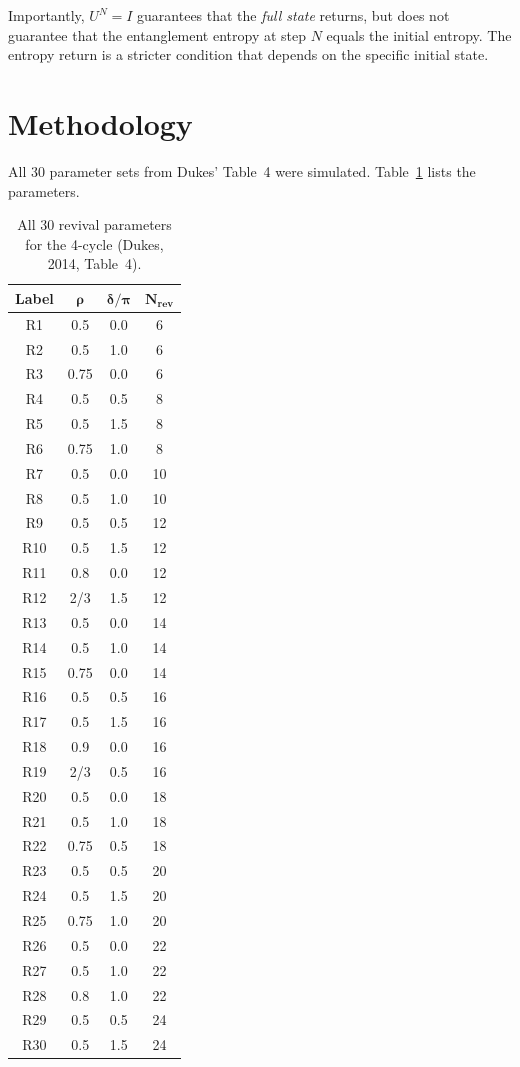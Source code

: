 \documentclass[12pt,a4paper]{article}
\begin{document}
Importantly, $U^N = I$ guarantees that the \emph{full state} returns, but does not guarantee that the entanglement entropy at step $N$ equals the initial entropy. The entropy return is a stricter condition that depends on the specific initial state.

\section{Methodology}

All 30 parameter sets from Dukes' Table~4 \cite{dukes} were simulated. Table~\ref{tab:parameters} lists the parameters.

\begin{table}[H]
\centering
\caption{All 30 revival parameters for the 4-cycle (Dukes, 2014, Table~4).}
\label{tab:parameters}
\begin{tabular}{cccc}
\toprule
\textbf{Label} & $\boldsymbol{\rho}$ & $\boldsymbol{\delta/\pi}$ & $\boldsymbol{N_{\text{rev}}}$ \\
\midrule
R1  & 0.5   & 0.0 & 6  \\
R2  & 0.5   & 1.0 & 6  \\
R3  & 0.75  & 0.0 & 6  \\
R4  & 0.5   & 0.5 & 8  \\
R5  & 0.5   & 1.5 & 8  \\
R6  & 0.75  & 1.0 & 8  \\
R7  & 0.5   & 0.0 & 10 \\
R8  & 0.5   & 1.0 & 10 \\
R9  & 0.5   & 0.5 & 12 \\
R10 & 0.5   & 1.5 & 12 \\
R11 & 0.8   & 0.0 & 12 \\
R12 & 2/3   & 1.5 & 12 \\
R13 & 0.5   & 0.0 & 14 \\
R14 & 0.5   & 1.0 & 14 \\
R15 & 0.75  & 0.0 & 14 \\
R16 & 0.5   & 0.5 & 16 \\
R17 & 0.5   & 1.5 & 16 \\
R18 & 0.9   & 0.0 & 16 \\
R19 & 2/3   & 0.5 & 16 \\
R20 & 0.5   & 0.0 & 18 \\
R21 & 0.5   & 1.0 & 18 \\
R22 & 0.75  & 0.5 & 18 \\
R23 & 0.5   & 0.5 & 20 \\
R24 & 0.5   & 1.5 & 20 \\
R25 & 0.75  & 1.0 & 20 \\
R26 & 0.5   & 0.0 & 22 \\
R27 & 0.5   & 1.0 & 22 \\
R28 & 0.8   & 1.0 & 22 \\
R29 & 0.5   & 0.5 & 24 \\
R30 & 0.5   & 1.5 & 24 \\
\bottomrule
\end{tabular}
\end{table}
\end{document}
